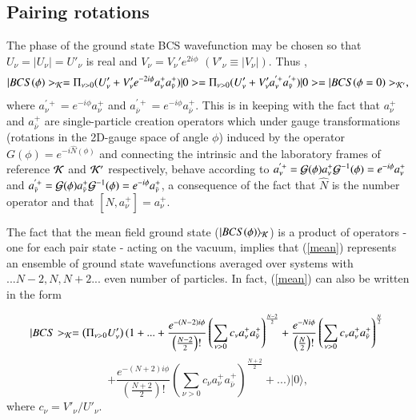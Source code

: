 \documentclass[a4paper,14pt]{book}
\begin{document}
\subsection{Pairing rotations}

The phase of the ground state BCS wavefunction may be chosen so that $U_{\nu} = |U_{\nu}| = U'_{\nu}$
is real and $V_{\nu} = V_{\nu}' e^{2 i \phi}$ $(V'_{\nu} \equiv |V_{\nu}|)$. Thus \cite{Bardeen:57both,Schrieffer:64,Schrieffer:72},
\begin{equation}
|BCS(\phi)>_{\cal K}  = \Pi_{\nu>0} (U'_{\nu} + V'_{\nu} e^{-2 i \phi} a^+_{\nu} a^+_{\bar \nu}) |0> = 
\Pi_{\nu>0} (U'_{\nu} + V'_{\nu} a^{'+}_{\nu} a^{'+}_{\bar \nu}) |0> = |BCS(\phi =0)>_{\cal K'},
\label{mean}
\end{equation}
where $a^{'+}_{\nu} = e^{-i \phi}a^+_{\nu}$ and   $a^{'+}_{\bar \nu} = e^{-i \phi}a^+_{\bar \nu}$.
This is in keeping with the fact that $a^+_{\nu}$ and $a^+_{\bar \nu}$ are single-particle  creation 
operators which under gauge transformations (rotations
in the 2D-gauge space of angle $\phi$) induced by the operator $G(\phi) = e^{- i \hat N (\phi)}$ and connecting the intrinsic and the laboratory frames of reference ${\cal K}$ and ${\cal K'}$ respectively, behave according to 
$a^{'+}_{\nu} = {\cal G} (\phi) a^+_{\nu} {\cal G}^{-1} (\phi)= e^{- i \phi} a^+_{\nu}$ and 
$a^{'+}_{\bar \nu} = {\cal G} (\phi) a^+_{\bar \nu} {\cal G}^{-1} (\phi)= e^{- i \phi} a^+_{\bar \nu}$, a consequence of the fact that $\hat N$ is the number operator and that $[\hat N, a^+_{\nu}] = a^+_{\nu}$.


The fact that the  mean field ground state  ($|BCS(\phi)\rangle_{\cal K}$) is a product of operators - one for each pair state - acting on the vacuum,
implies that (\ref{mean}) represents an ensemble of ground state wavefunctions averaged over systems with $... N-2,N,N+2 ...$ even number of particles.
In fact, (\ref{mean}) can also be written in the form 


\begin{equation}
|BCS>_{\cal K} = \left( \Pi_{\nu>0} U'_{\nu} \right ) 
( 1 + ... + 
\frac{e^{-(N-2)i \phi}}{\left(\frac{N-2}{2}\right)!} 
\left( \sum_{\nu>0} c_{\nu} a^+_{\nu}a^+_{\bar \nu} \right)^{\frac{N-2}{2}} +  \\
\frac{e^{-Ni \phi}}{\left(\frac{N}{2}\right)!} 
\left(\sum_{\nu>0}c_{\nu} a^+_{\nu}a^+_{\bar \nu}\right)^{\frac {N}{2}}   \\
\nonumber
\end{equation}
\begin{equation}
 + \frac{e^{-(N+2)i \phi}}{\left(\frac{N+2}{2}\right)!} 
\left(\sum_{\nu>0} c_{\nu} a^+_{\nu}a^+_{\bar \nu} \right)^{\frac {N+2}{2}} + ... 
)|0\rangle,
\end{equation} 
where $c_{\nu} = V'_{\nu}/U'_{\nu}$.
\end{document}

